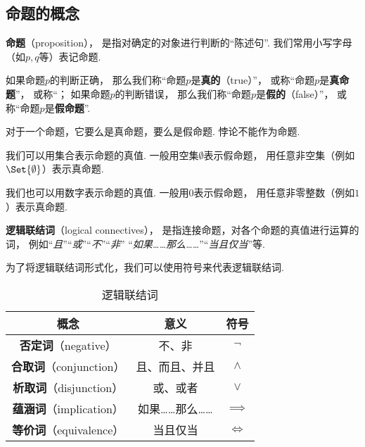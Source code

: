 \subsection{命题的概念}
\begin{definition}
\textbf{命题}（proposition），%
是指对确定的对象进行判断的“陈述句”.
我们常用小写字母（如\(p,q\)等）表记命题.
\end{definition}

\begin{definition}
如果命题\(p\)的判断正确，%
那么我们称“命题\(p\)是\textbf{真的}（true）”，%
或称“命题\(p\)是\textbf{真命题}”，
或称“；
如果命题\(p\)的判断错误，%
那么我们称“命题\(p\)是\textbf{假的}（false）”，%
或称“命题\(p\)是\textbf{假命题}”.
\end{definition}

对于一个命题，它要么是真命题，要么是假命题.
悖论不能作为命题.

我们可以用集合表示命题的真值.
一般用空集\(\emptyset\)表示假命题，%
用任意非空集（例如\(\Set{\emptyset}\)）表示真命题.

我们也可以用数字表示命题的真值.
一般用\(0\)表示假命题，%
用任意非零整数（例如\(1\)）表示真命题.

\begin{definition}
\textbf{逻辑联结词}（logical connectives），%
是指连接命题，对各个命题的真值进行运算的词，%
例如“\emph{且}”“\emph{或}”“\emph{不}”“\emph{非}”%
“\emph{如果……那么……}”“\emph{当且仅当}”等.
\end{definition}

为了将逻辑联结词形式化，我们可以使用符号来代表逻辑联结词.

\begin{table}[bp]
\centering
\begin{tabular}{|*{3}{c|}}
\hline
\textbf{概念} & \textbf{意义} & \textbf{符号} \\ \hline
\textbf{否定词}（negative） & 不、非 & \(\neg\) \\ \hline
\textbf{合取词}（conjunction） & 且、而且、并且 & \(\land\) \\ \hline
\textbf{析取词}（disjunction） & 或、或者 & \(\lor\) \\ \hline
\textbf{蕴涵词}（implication） & 如果……那么…… & \(\implies\) \\ \hline
\textbf{等价词}（equivalence） & 当且仅当 & \(\iff\) \\ \hline
\end{tabular}
\caption{逻辑联结词}
\end{table}

